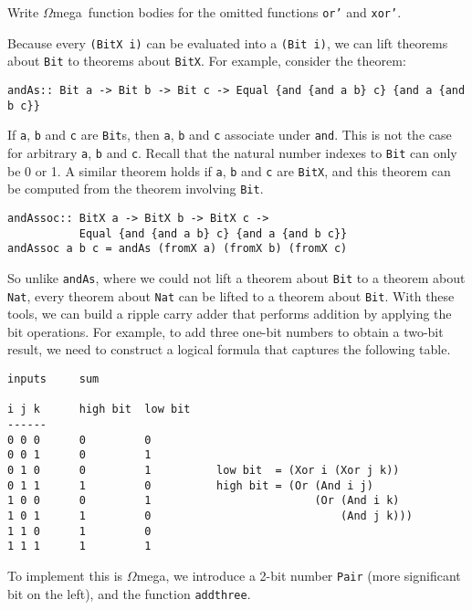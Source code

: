 \documentclass[11pt,twoside,A4]{llncs}
\newcommand{\om}{\emph{$\Omega$}mega}
\begin{document}
\begin{exercise}
Write \om\ function bodies for the
omitted functions {\tt or'} and {\tt xor'}.
\end{exercise}


Because every \verb+(BitX i)+ can be evaluated into a \verb+(Bit i)+,
we can lift theorems about \verb+Bit+ to theorems about \verb+BitX+.
For example, consider the theorem:
{\small
\begin{verbatim}
andAs:: Bit a -> Bit b -> Bit c -> Equal {and {and a b} c} {and a {and b c}}
\end{verbatim}}
If {\tt a}, {\tt b} and {\tt c} are {\tt Bit}s, then  {\tt a}, {\tt b} and {\tt c}
associate under {\tt and}.  This is not the case for arbitrary  {\tt a}, {\tt b} and {\tt c}.
Recall that the natural number indexes to {\tt Bit} can only be 0 or 1. A similar
theorem holds if  {\tt a}, {\tt b} and {\tt c} are {\tt BitX}, and this theorem
can be computed from the theorem involving {\tt Bit}.

{\small
\begin{verbatim}
andAssoc:: BitX a -> BitX b -> BitX c -> 
           Equal {and {and a b} c} {and a {and b c}}
andAssoc a b c = andAs (fromX a) (fromX b) (fromX c)
\end{verbatim}}

So unlike {\tt andAs}, where we could not lift a theorem about {\tt Bit} to
a theorem about {\tt Nat}, every theorem about {\tt Nat} can be lifted to a theorem about {\tt Bit}.
With these tools,  we can build a ripple carry adder that performs
addition by applying the bit operations. For example, to add
three one-bit numbers to obtain a two-bit result, we need to
construct a logical formula that captures the following table.

{\small
\begin{verbatim}
inputs     sum

i j k      high bit  low bit
------
0 0 0      0         0
0 0 1      0         1
0 1 0      0         1          low bit  = (Xor i (Xor j k))
0 1 1      1         0          high bit = (Or (And i j) 
1 0 0      0         1                         (Or (And i k) 
1 0 1      1         0                             (And j k)))
1 1 0      1         0
1 1 1      1         1
\end{verbatim}}

To implement this is \om, we introduce a 2-bit number \verb+Pair+ (more significant bit on the left),
and the function \verb+addthree+.
\end{document}
